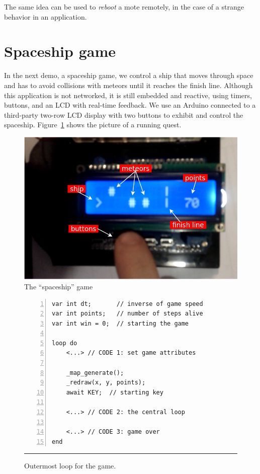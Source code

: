 The same idea can be used to \emph{reboot} a mote remotely, in the case of a 
strange behavior in an application.

\section{Spaceship game}

In the next demo, a spaceship game, we control a ship that moves through space 
and has to avoid collisions with meteors until it reaches the finish line.
%
Although this application is not networked, it is still embedded and reactive, 
using timers, buttons, and an LCD with real-time feedback.
%
We use an Arduino connected to a third-party two-row LCD display with two 
buttons to exhibit and control the spaceship.
%
Figure~\ref{fig:ship} shows the picture of a running quest.

\begin{figure}[t]
\centering
\includegraphics[scale=0.30]{ship.png}
\caption{ The ``spaceship'' game
\label{fig:ship}
}
\end{figure}

\begin{figure}[ht]
\begin{lstlisting}[numbers=left,xleftmargin=2em]
var int dt;       // inverse of game speed
var int points;   // number of steps alive
var int win = 0;  // starting the game

loop do
    <...> // CODE 1: set game attributes

    _map_generate();
    _redraw(x, y, points);
    await KEY;  // starting key

    <...> // CODE 2: the central loop

    <...> // CODE 3: game over
end
\end{lstlisting}
\rule{14cm}{0.37pt}
\caption{ Outermost loop for the game.
{\small %
}%
\label{lst.ship.1}
}
\end{figure}

